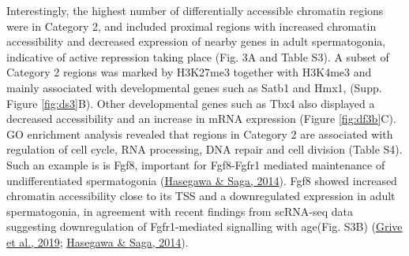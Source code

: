 \documentclass[12pt,twoside]{reedthesis}
\begin{document}
Interestingly, the highest number of differentially accessible chromatin
regions were in Category 2, and included proximal regions with increased
chromatin accessibility and decreased expression of nearby genes in
adult spermatogonia, indicative of active repression taking place (Fig.
3A and Table S3). A subset of Category 2 regions was marked by H3K27me3
together with H3K4me3 and mainly associated with developmental genes
such as Satb1 and Hmx1, (Supp. Figure \ref{fig:ds3}B). Other developmental genes such as
Tbx4 also displayed a decreased accessibility and an increase in mRNA
expression (Figure \ref{fig:df3b}C). GO enrichment analysis revealed that regions in
Category 2 are associated with regulation of cell cycle, RNA processing,
DNA repair and cell division (Table S4). Such an example is is Fgf8,
important for Fgf8-Fgfr1 mediated maintenance of undifferentiated
spermatogonia (\protect\hyperlink{ref-hasegawa2014}{Hasegawa \& Saga, 2014}). Fgf8 showed increased chromatin
accessibility close to its TSS and a downregulated expression in adult
spermatogonia, in agreement with recent findings from scRNA-seq data
suggesting downregulation of Fgfr1-mediated signalling with age(Fig.
S3B) (\protect\hyperlink{ref-grive2019}{Grive et al., 2019}; \protect\hyperlink{ref-hasegawa2014}{Hasegawa \& Saga, 2014}).
\end{document}
